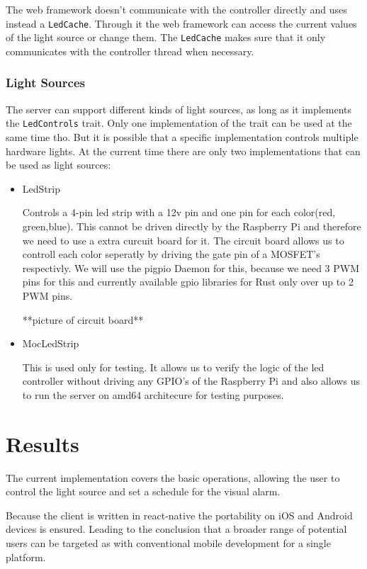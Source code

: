 \documentclass[conference]{IEEEtran}
\begin{document}
The web framework doesn't communicate with the controller directly and uses instead a \texttt{LedCache}. Through it the web 
framework can access the current values of the light source or change them. The \texttt{LedCache} makes sure that it only communicates
with the controller thread when necessary.


\subsubsection{Light Sources}
The server can support different kinds of light sources, as long as it implements the \texttt{LedControls} trait. Only one
implementation of the trait can be used at the same time tho. But it is possible that a specific implementation controls multiple
hardware lights. At the current time there are only two implementations that can be used as light sources:

\begin{itemize}
    \item LedStrip
    
    Controls a 4-pin led strip with a 12v pin and one pin for each color(red, green,blue). This cannot be driven directly by the
    Raspberry Pi and therefore we need to use a extra curcuit board\cite{rpiled} for it. The circuit board allows us to controll each
    color seperatly by driving the gate pin of a MOSFET's respectivly. We will use the pigpio Daemon\cite{pigpiod} for this, 
    because we need 3 PWM pins for this and currently available gpio libraries for Rust only over up to 2 PWM pins.
    
    **picture of circuit board**

    \item MocLedStrip
    
    This is used only for testing. It allows us to verify the logic of the led controller without driving any GPIO's of the
    Raspberry Pi and also allows us to run the server on amd64 architecure for testing purposes.
\end{itemize}



\section{Results}
The current implementation covers the basic operations, allowing the user to control the light source and set a schedule
for the visual alarm. 

Because the client is written in react-native the portability on iOS and Android devices is ensured. Leading to the conclusion
that a broader range of potential users can be targeted as with conventional mobile development for a single platform.
\end{document}
